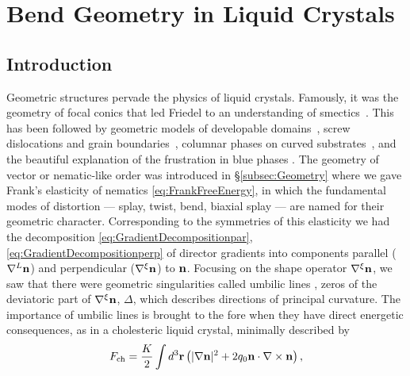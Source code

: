 \chapter{Bend Geometry in Liquid Crystals}
\label{ch:TwistBend}
\section{Introduction}
Geometric structures pervade the physics of liquid crystals. Famously, it was the geometry of focal conics that led Friedel to an understanding of smectics~\citep{friedel1910}. This has been followed by geometric models of developable domains~\citep{kleman80,bouligand80}, screw dislocations and grain boundaries~\citep{kamien99}, columnar phases on curved substrates~\citep{santangelo07}, and the beautiful explanation of the frustration in blue phases \citep{sethna83}. The geometry of vector or nematic-like order was introduced in \S\ref{subsec:Geometry} where we gave Frank's elasticity of nematics \eqref{eq:FrankFreeEnergy}, in which the fundamental modes of distortion --- splay, twist, bend, biaxial splay --- are named for their geometric character. Corresponding to the symmetries of this elasticity we had the decomposition \eqref{eq:GradientDecompositionpar}, \eqref{eq:GradientDecompositionperp} of director gradients into components parallel ($\nabla^L \mathbf{n}$) and perpendicular ($\nabla^\xi \mathbf{n}$) to $\mathbf{n}$. Focusing on the shape operator $\nabla^\xi \mathbf{n}$, we saw that there were geometric singularities called umbilic lines \citep{Machon2016b}, zeros of the deviatoric part of $\nabla^\xi \mathbf{n}$, $\Delta$, which describes directions of principal curvature. The importance of umbilic lines is brought to the fore when they have direct energetic consequences, as in a cholesteric liquid crystal, minimally described by 
\begin{equation}
    F_{\mathrm{ch}} = \frac{K}{2}  \int d^3 {\bf r}\left(|\nabla {\bf n}|^2 +2 q_0 {\bf n} \cdot \nabla \times {\bf n} \right),
    \label{eq:CholestericFreeEnergy}
\end{equation}
